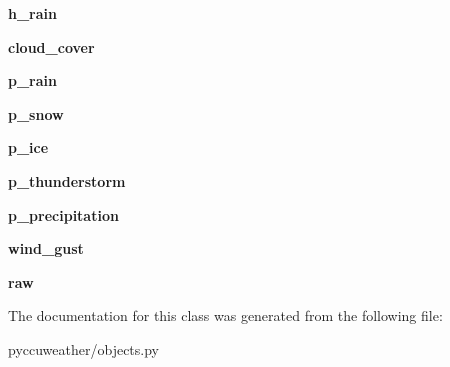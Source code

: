 \begin{DoxyCompactItemize}
\item 
\hypertarget{classpyccuweather_1_1objects_1_1_hemiurnal_adbd1f190ab5134cdccd4bf34d2c1c3e9}{}{\bfseries h\+\_\+rain}\label{classpyccuweather_1_1objects_1_1_hemiurnal_adbd1f190ab5134cdccd4bf34d2c1c3e9}

\item 
\hypertarget{classpyccuweather_1_1objects_1_1_hemiurnal_a917d2c35ca9196b9767ac7c49390ce63}{}{\bfseries cloud\+\_\+cover}\label{classpyccuweather_1_1objects_1_1_hemiurnal_a917d2c35ca9196b9767ac7c49390ce63}

\item 
\hypertarget{classpyccuweather_1_1objects_1_1_hemiurnal_ae2179180bffc08a06a074bc7073342d2}{}{\bfseries p\+\_\+rain}\label{classpyccuweather_1_1objects_1_1_hemiurnal_ae2179180bffc08a06a074bc7073342d2}

\item 
\hypertarget{classpyccuweather_1_1objects_1_1_hemiurnal_a93fefe1768bfc0f31a71103571e8cb8d}{}{\bfseries p\+\_\+snow}\label{classpyccuweather_1_1objects_1_1_hemiurnal_a93fefe1768bfc0f31a71103571e8cb8d}

\item 
\hypertarget{classpyccuweather_1_1objects_1_1_hemiurnal_a6a1ab6daa88ae5ac9bab73f278f7dc8b}{}{\bfseries p\+\_\+ice}\label{classpyccuweather_1_1objects_1_1_hemiurnal_a6a1ab6daa88ae5ac9bab73f278f7dc8b}

\item 
\hypertarget{classpyccuweather_1_1objects_1_1_hemiurnal_a5a2a7d678c742151f7f163648317489d}{}{\bfseries p\+\_\+thunderstorm}\label{classpyccuweather_1_1objects_1_1_hemiurnal_a5a2a7d678c742151f7f163648317489d}

\item 
\hypertarget{classpyccuweather_1_1objects_1_1_hemiurnal_af0ba559638fa22de1cba1e0ca5c749ac}{}{\bfseries p\+\_\+precipitation}\label{classpyccuweather_1_1objects_1_1_hemiurnal_af0ba559638fa22de1cba1e0ca5c749ac}

\item 
\hypertarget{classpyccuweather_1_1objects_1_1_hemiurnal_a4ad05c068544cf2c018092f49c84029b}{}{\bfseries wind\+\_\+gust}\label{classpyccuweather_1_1objects_1_1_hemiurnal_a4ad05c068544cf2c018092f49c84029b}

\item 
\hypertarget{classpyccuweather_1_1objects_1_1_hemiurnal_a4b06823bf078385305e2c54a7fa0db09}{}{\bfseries raw}\label{classpyccuweather_1_1objects_1_1_hemiurnal_a4b06823bf078385305e2c54a7fa0db09}

\end{DoxyCompactItemize}


The documentation for this class was generated from the following file\+:\begin{DoxyCompactItemize}
\item 
pyccuweather/objects.\+py\end{DoxyCompactItemize}
